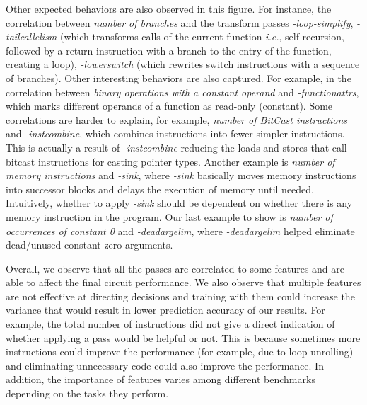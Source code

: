 Other expected behaviors are also observed in this figure. For instance, the correlation between \textit{number of branches} and the transform passes \textit{-loop-simplify}, \textit{-tailcallelism} (which transforms calls of the current function \textit{i.e.}, self recursion, followed by a return instruction with a branch to the entry of the function, creating a loop), \textit{-lowerswitch} (which rewrites switch instructions with a sequence of branches). Other interesting behaviors are also captured. For example, in the correlation between \textit{binary operations with a constant operand} and \textit{-functionattrs}, which marks different operands of a function as read-only (constant). 
Some correlations are harder to explain, for example, \textit{number of BitCast instructions} and \textit{-instcombine}, which combines  instructions into fewer simpler instructions. This is actually a result of \textit{-instcombine} reducing the loads and stores that call bitcast instructions for casting pointer types.  
Another example is \textit{number of memory instructions} and \textit{-sink}, where \textit{-sink} basically moves memory instructions into successor blocks and delays the execution of memory until needed.  Intuitively, whether to apply \textit{-sink} should be dependent on whether there is any memory instruction in the program. 
Our last example to show is \textit{number of occurrences of constant 0} and \textit{-deadargelim}, where \textit{-deadargelim} helped eliminate dead/unused constant zero arguments. 


Overall, we observe that all the passes %
are correlated to some features and are able to affect the final circuit performance. 
We also observe that multiple features are not effective at directing decisions and training with them could increase the variance that would result in lower prediction accuracy of our results. 
For example, the total number of instructions did not give a direct indication of whether applying a pass would be helpful or not. This is because sometimes more instructions could improve the performance (for example, due to loop unrolling) and eliminating unnecessary code could also improve the performance. In addition, the importance of features varies among different benchmarks depending on the tasks they perform.
\vspace{-0.2cm}
